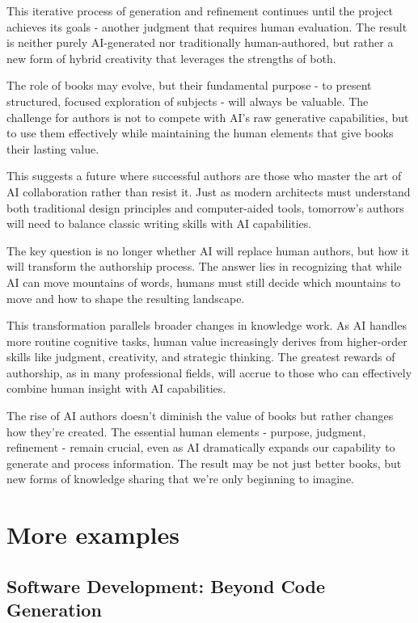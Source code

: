 \documentclass[
  Letterpaper,
]{scrbook}
\begin{document}
This iterative process of generation and refinement continues until the
project achieves its goals - another judgment that requires human
evaluation. The result is neither purely AI-generated nor traditionally
human-authored, but rather a new form of hybrid creativity that
leverages the strengths of both.

The role of books may evolve, but their fundamental purpose - to present
structured, focused exploration of subjects - will always be valuable.
The challenge for authors is not to compete with AI's raw generative
capabilities, but to use them effectively while maintaining the human
elements that give books their lasting value.

This suggests a future where successful authors are those who master the
art of AI collaboration rather than resist it. Just as modern architects
must understand both traditional design principles and computer-aided
tools, tomorrow's authors will need to balance classic writing skills
with AI capabilities.

The key question is no longer whether AI will replace human authors, but
how it will transform the authorship process. The answer lies in
recognizing that while AI can move mountains of words, humans must still
decide which mountains to move and how to shape the resulting landscape.

This transformation parallels broader changes in knowledge work. As AI
handles more routine cognitive tasks, human value increasingly derives
from higher-order skills like judgment, creativity, and strategic
thinking. The greatest
rewards of authorship, as in many professional fields, will accrue to
those who can effectively combine human insight with AI capabilities.

The rise of AI authors doesn't diminish the value of books but rather
changes how they're created. The essential human elements - purpose,
judgment, refinement - remain crucial, even as AI dramatically expands
our capability to generate and process information. The result may be
not just better books, but new forms of knowledge sharing that we're
only beginning to imagine.

\section{More examples}\label{more-examples}

\subsection{\texorpdfstring{Software
Development: Beyond Code
Generation}{Software Development: Beyond Code Generation}}\label{software-development-beyond-code-generation}
\end{document}
